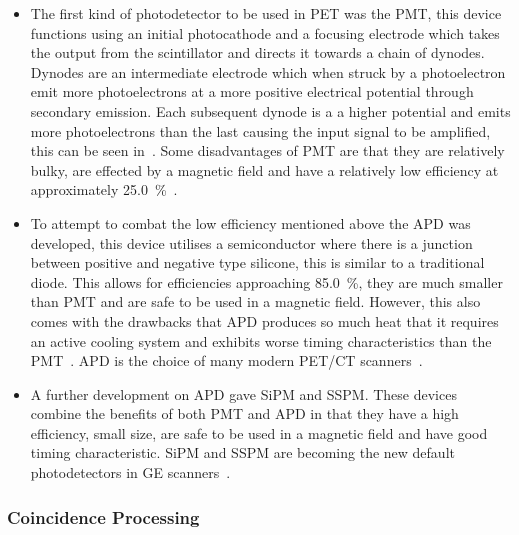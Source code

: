                 \begin{itemize}
                    \item The first kind of photodetector to be used in \gls{PET} was the \gls{PMT}, this device functions using an initial photocathode and a focusing electrode which takes the output from the scintillator and directs it towards a chain of dynodes. Dynodes are an intermediate electrode which when struck by a photoelectron emit more photoelectrons at a more positive electrical potential through secondary emission. Each subsequent dynode is a a higher potential and emits more photoelectrons than the last causing the input signal to be amplified, this can be seen in~. Some disadvantages of \gls{PMT} are that they are relatively bulky, are effected by a magnetic field and have a relatively low efficiency at approximately \SI{25.0}{\percent}~.
                    
                    \item To attempt to combat the low efficiency mentioned above the \gls{APD} was developed, this device utilises a semiconductor where there is a junction between positive and negative type silicone, this is similar to a traditional diode. This allows for efficiencies approaching \SI{85.0}{\percent}, they are much smaller than \gls{PMT} and are safe to be used in a magnetic field. However, this also comes with the drawbacks that \gls{APD} produces so much heat that it requires an active cooling system and exhibits worse timing characteristics than the \gls{PMT}~. \gls{APD} is the choice of many modern \gls{PET}/\gls{CT} scanners~.
                    
                    \item A further development on \gls{APD} gave \gls{SiPM} and \gls{SSPM}. These devices combine the benefits of both \gls{PMT} and \gls{APD} in that they have a high efficiency, small size, are safe to be used in a magnetic field and have good timing characteristic. \gls{SiPM} and \gls{SSPM} are becoming the new default photodetectors in \gls{GE} scanners~.
                \end{itemize}
            
            \subsubsection{Coincidence Processing} \label{sec:coincidence_processing}
                
